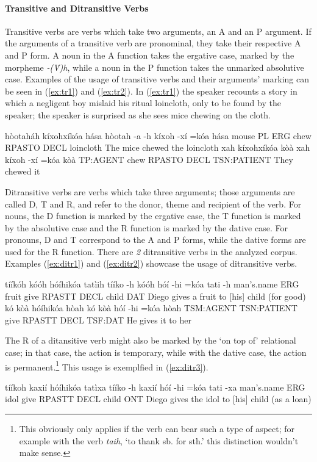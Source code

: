 \documentclass[a4paper, 12pt, oneside]{memoir}
\newcommand{\emh}[1]{\textit{#1}}
\begin{document}
\paragraph{Transitive and Ditransitive Verbs}\label{s:trans}
Transitive verbs are verbs which take two arguments, an A and an P argument. If the arguments of a transitive verb are pronominal, they take their respective A and P form. A noun in the A function takes the ergative case, marked by the morpheme \emh{-(V́)h}, while a noun in the P function takes the unmarked absolutive case. Examples of the usage of transitive verbs and their arguments' marking can be seen in (\ref{ex:tr1}) and (\ref{ex:tr2}). In (\ref{ex:tr1}) the speaker recounts a story in which a negligent boy mislaid his ritual loincloth, only to be found by the speaker; the speaker is surprised as she sees mice chewing on the cloth.
\begin{examples}
    \ex \label{ex:tr1}
    \words hòotaháh kíxohxíkóa hása
    \bits hòotah -a -h kíxoh -xí =kóa hása 
    \gloss mouse PL ERG chew RPASTO DECL loincloth
    \tr The mice chewed the loincloth
    \ex \label{ex:tr2}
    \words xah kíxohxíkóa kòà
    \bits xah kíxoh -xí =kóa kòà
    \gloss TP:AGENT chew RPASTO DECL TSN:PATIENT
    \tr They chewed it
\end{examples} 
Ditransitive verbs are verbs which take three arguments; those arguments are called D, T and R, and refer to the donor, theme and recipient of the verb. For nouns, the D function is marked by the ergative case, the T function is marked by the absolutive case and the R function is marked by the dative case. For pronouns, D and T correspond to the A and P forms, while the dative forms are used for the R function. There are \textit{2} ditransitive verbs in the analyzed corpus. Examples (\ref{ex:ditr1}) and (\ref{ex:ditr2}) showcase the usage of ditransitive verbs. 
\begin{examples}
    \ex \label{ex:ditr1}
    \words tííkóh kóóh hóíhikóa tatìih
    \bits tííko -h kóóh hóí -hi =kóa tati -h
    \gloss man's.name ERG fruit give RPASTT DECL child DAT
    \tr Diego gives a fruit to [his] child (for good)
    \ex \label{ex:ditr2}
    \words kó kòà hóíhikóa hòah
    \bits kó kòà hóí -hi =kóa hòah
    \gloss TSM:AGENT TSN:PATIENT give RPASTT DECL TSF:DAT
    \tr He gives it to her
\end{examples}
The R of a ditansitive verb might also be marked by the `on top of' relational case; in that case, the action is temporary, while with the dative case, the action is permanent.\footnote{This obviously only applies if the verb can bear such a type of aspect; for example  with the verb \emh{taih}, `to thank sb. for sth.' this distinction wouldn't make sense.} This  usage is exemplfied in (\ref{ex:ditr3}). 
\begin{examples}
    \ex \label{ex:ditr3}
    \words tííkoh kaxií hóíhikóa tatìxa
    \bits tííko -h kaxií hóí -hi =kóa tati -xa
    \gloss man's.name ERG idol give RPASTT DECL child ONT
    \tr Diego gives the idol to [his] child (as a loan)
\end{examples}
\end{document}

